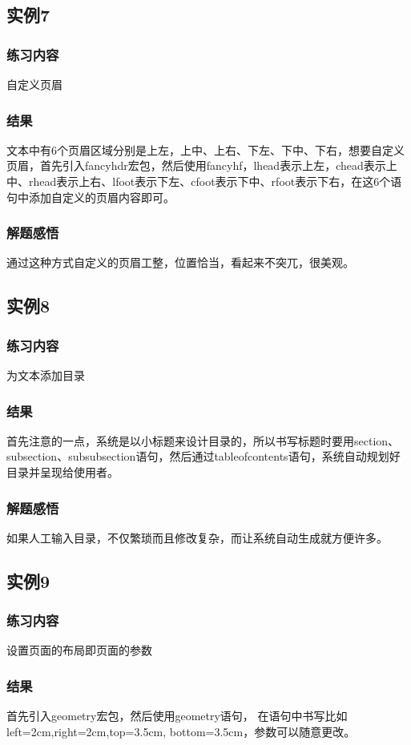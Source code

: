 \documentclass{ctexart}
\begin{document}
\subsection{实例7}
\subsubsection{练习内容}
自定义页眉
\subsubsection{结果}
文本中有6个页眉区域分别是上左，上中、上右、下左、下中、下右，想要自定义页眉，首先引入fancyhdr宏包，然后使用fancyhf，lhead表示上左，chead表示上中、rhead表示上右、lfoot表示下左、cfoot表示下中、rfoot表示下右，在这6个语句中添加自定义的页眉内容即可。
\subsubsection{解题感悟}
通过这种方式自定义的页眉工整，位置恰当，看起来不突兀，很美观。
\subsection{实例8}
\subsubsection{练习内容}
为文本添加目录
\subsubsection{结果}
首先注意的一点，系统是以小标题来设计目录的，所以书写标题时要用section、subsection、subsubsection语句，然后通过tableofcontents语句，系统自动规划好目录并呈现给使用者。
\subsubsection{解题感悟}
如果人工输入目录，不仅繁琐而且修改复杂，而让系统自动生成就方便许多。
\subsection{实例9}
\subsubsection{练习内容}
设置页面的布局即页面的参数
\subsubsection{结果}
首先引入geometry宏包，然后使用geometry语句，
在语句中书写比如left=2cm,right=2cm,top=3.5cm,
bottom=3.5cm，参数可以随意更改。
\end{document}
